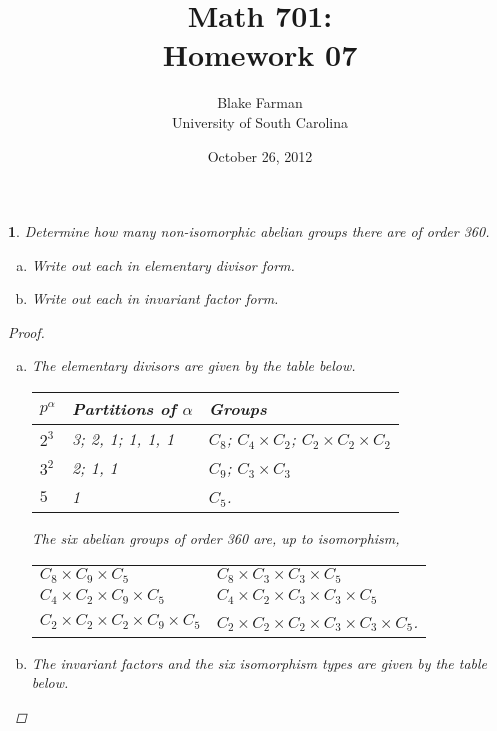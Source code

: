 \documentclass[10pt]{amsart}
\author{Blake Farman\\University of South Carolina}
\title{Math 701:\\Homework 07}
\date{October 26, 2012}
\begin{document}
\maketitle

\newtheorem{thm}{}
\newtheorem{lem}{Lemma}

\begin{thm}
  Determine how many non-isomorphic abelian groups there are of order 360.
  \begin{enumerate}[(a)]
  \item
    Write out each in elementary divisor form.
  \item
    Write out each in invariant factor form.
  \end{enumerate}
  
  \begin{proof}
    \begin{enumerate}[(a)]
    \item
      The elementary divisors are given by the table below.\\
      \begin{center}
        \begin{tabular}{l| l | l}
          $p^\alpha$ & Partitions of $\alpha$ & Groups\\
          \hline
          $2^3$ & 3; 2, 1; 1, 1, 1 & $C_8$; $C_4 \times C_2$; $C_2 \times C_2 \times C_2$\\
          $3^2$ & 2; 1, 1 & $C_9$; $C_3 \times C_3$\\
          $5$ & 1 & $C_5$.
        \end{tabular}
      \end{center}
      The six abelian groups of order 360 are, up to isomorphism,\\
      \begin{center}
        \begin{tabular}{l l}
          $C_8 \times C_9 \times C_5$ & $C_8 \times C_3 \times C_3 \times C_5$\\
          $C_4 \times C_2 \times C_9 \times C_5$ & $C_4 \times C_2 \times C_3 \times C_3 \times C_5$\\
          $C_2 \times C_2 \times C_2 \times C_9 \times C_5$ & $C_2 \times C_2 \times C_2 \times C_3 \times C_3 \times C_5$.
        \end{tabular}
      \end{center}
    \item
      The invariant factors and the six isomorphism types are given by the table below.\\

\end{enumerate}
\end{proof}
\end{thm}
\end{document}
